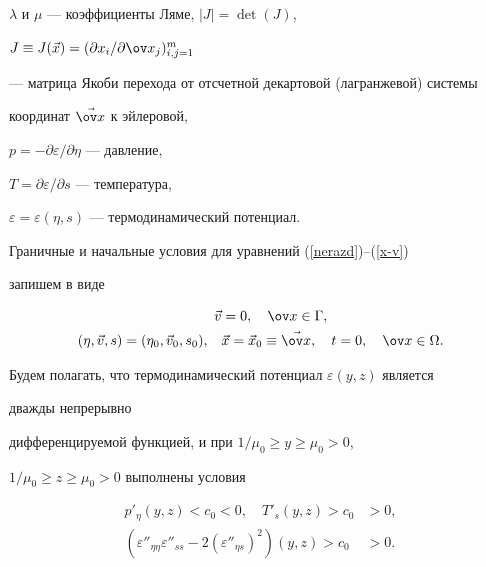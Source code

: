$\lambda$ и $\mu$ --- коэффициенты Ляме, $|J|=\det(J)$,


$J\equiv J(\Vec x)=(\partial x_i/\partial \ov x_j)_{i,j=1}^m$


--- матрица Якоби перехода от отсчетной декартовой (лагранжевой) системы


координат $\Vec{\ov x}$ к эйлеровой,


$p=-\partial \varepsilon /\partial \eta$ --- давление,


$T=\partial \varepsilon /\partial s$ --- температура,


$\varepsilon=\varepsilon(\eta,s)$ --- термодинамический потенциал.





Граничные и начальные условия для уравнений (\ref{nerazd})--(\ref{x-v})


запишем в виде


\begin{equation}


\label{BoundCond}


\begin{split}


\Vec v&=0,\quad \ov x \in \Gamma,\\


(\eta,\Vec v,s)=(\eta_0,\Vec v_0,s_0),


\quad &\Vec x=\Vec x_0\equiv \Vec {\ov x},


\quad t=0,\quad \ov x\in \Omega.


\end{split}


\end{equation}


Будем полагать, что термодинамический потенциал $\varepsilon(y,z)$ является


дважды непрерывно


дифференцируемой функцией, и при $1/\mu_0\ge y\ge \mu_0>0$,


$1/\mu_0\ge z\ge \mu_0>0$ выполнены условия


\begin{equation}


\label{Bete}


\begin{split}


p'_\eta(y,z)<c_0<0,\quad T'_s(y,z)>c_0&>0,\\


\left(\varepsilon''_{\eta \eta}\varepsilon''_{s s}


-2(\varepsilon''_{\eta s})^2 \right)(y,z)>c_0&>0.


\end{split}


\end{equation}


